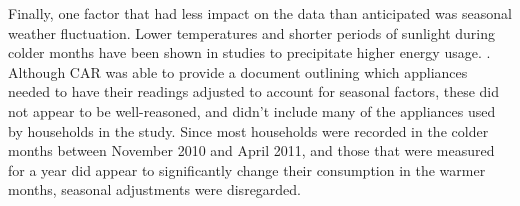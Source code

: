Finally, one factor that had less impact on the data than anticipated was seasonal weather fluctuation. Lower temperatures and shorter periods of sunlight during colder months have been shown in studies to precipitate higher energy usage.  \cite{DECC}. Although CAR was able to provide a document outlining which appliances needed to have their readings adjusted to account for seasonal factors, these did not appear to be well-reasoned, and didn't include many of the appliances used by households in the study. Since most households were recorded in the colder months between November 2010 and April 2011, and those that were measured for a year did appear to significantly change their consumption in the warmer months, seasonal adjustments were disregarded.
